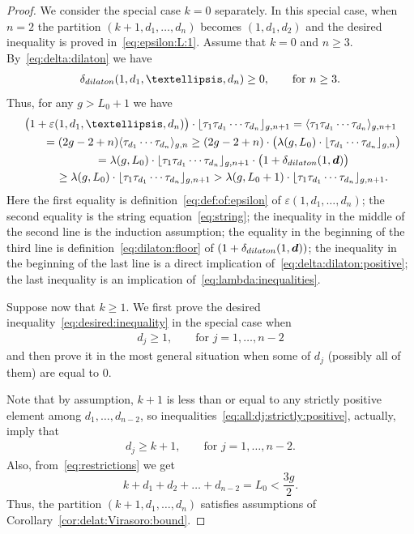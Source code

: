 \documentclass[11pt]{article}
\renewcommand{\epsilon}{\varepsilon}
\theoremstyle{definition}
\begin{document}
\begin{proof}
We consider the special case $k=0$ separately. In this special case,
when $n=2$ the
partition $(k+1,d_1,\dots,d_n)$ becomes $(1,d_1,d_2)$ and the
desired inequality is proved in~\eqref{eq:epsilon:L:1}. Assume that
$k=0$ and $n\ge 3$. By~\eqref{eq:delta:dilaton} we
have
\begin{gather}\label{eq:delta:dilaton:positive}
\delta_{\rm dilaton}(1,d_1,\dots,d_n)\ge 0 ,\qquad\text{for }n\ge 3 .
\end{gather}
Thus, for any $g> L_0+1$ we have
\begin{gather*}
\big(1+\epsilon(1,d_1,\dots,d_n)\big)\cdot \lfloor \tau_1\tau_{d_1} \cdots \tau_{d_n}\rfloor_{g,n+1}=
\langle \tau_1\tau_{d_1} \cdots \tau_{d_n}\rangle_{g,n+1}\\
\qquad{} =(2g-2+n)\langle \tau_{d_1} \cdots \tau_{d_n}\rangle_{g,n}
\ge (2g-2+n)\cdot\big(\lambda(g,L_0)\cdot
\lfloor \tau_{d_1} \cdots \tau_{d_n}\rfloor_{g,n}\big)
\\
\qquad{} =\lambda(g,L_0)\cdot
\lfloor \tau_1\tau_{d_1} \cdots \tau_{d_n}\rfloor_{g,n+1}
\cdot\big(1+\delta_{\rm dilaton}(1,\boldsymbol{d})\big)
\\
\qquad{} \ge \lambda(g,L_0)\cdot
\lfloor \tau_1\tau_{d_1} \cdots \tau_{d_n}\rfloor_{g,n+1}
> \lambda(g,L_0+1)
\cdot
\lfloor \tau_1\tau_{d_1} \cdots \tau_{d_n}\rfloor_{g,n+1} .
\end{gather*}
Here the first equality is
definition~\eqref{eq:def:of:epsilon}
of $\epsilon(1,d_1,\dots,d_n)$; the second equality
is the string equation~\eqref{eq:string}; the
inequality in the middle of the second line is the
induction assumption; the equality in the beginning of the
third line is definition~\eqref{eq:dilaton:floor}
of $(1+\delta_{\rm dilaton}(1,\boldsymbol{d}))$;
the inequality in the beginning of the last line
is a direct implication of~\eqref{eq:delta:dilaton:positive};
the last inequality is an implication of~\eqref{eq:lambda:inequalities}.

Suppose now that $k\ge 1$. We first prove the desired inequality~\eqref{eq:desired:inequality} in the special case when
\begin{gather}\label{eq:all:dj:strictly:positive}
d_j\ge 1 ,\qquad\text{for }j=1,\dots,n-2
\end{gather}
and then prove it in the most general situation when some of $d_j$ (possibly all of them) are equal to $0$.

Note that by assumption, $k+1$ is less than or equal
to any strictly positive element among $d_1,\dots,d_{n-2}$,
so inequalities~\eqref{eq:all:dj:strictly:positive},
actually, imply that
\begin{gather*}%
d_j\ge k+1 ,\qquad\text{for }j=1,\dots,n-2.
\end{gather*}
Also, from~\eqref{eq:restrictions} we get
\[
k+d_1+d_2+\dots+d_{n-2}=L_0<\frac{3g}{2} .
\]
Thus, the partition $(k+1,d_1,\dots,d_n)$
satisfies assumptions of Corollary~\ref{cor:delat:Virasoro:bound}.


\end{proof}
\end{document}
